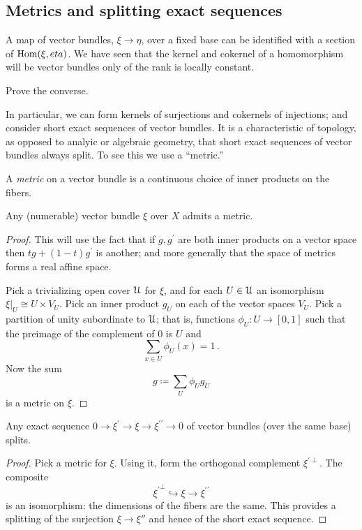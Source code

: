 \subsection{Metrics and splitting exact sequences}
A map of vector bundles, $\xi\to\eta$, over a fixed base can be identified
with a section of $\operatorname{Hom}(\xi,eta)$.  
We have seen that the kernel and cokernel of a homomorphism will be vector
bundles only of the rank is locally constant. 
\begin{exercise} Prove the converse. 
\end{exercise} 
In particular, we can form kernels of surjections and cokernels of injections;
and consider short exact sequences of vector bundles. It is a characteristic
of topology, as opposed to analyic or algebraic geometry, that short exact
sequences of vector bundles always split. To see this we use a ``metric.''
\begin{definition}
A \emph{metric} on a vector bundle is a continuous choice of inner products on
the fibers.
\end{definition}
\begin{lemma}
    Any (numerable) vector bundle $\xi$ over $X$ admits a metric.
\end{lemma}
\begin{proof}
This will use the fact that if $g,g^\prime$ are both inner
products on a vector space then $tg+(1-t)g^\prime$ is another; 
and more generally that the space of metrics forms a real affine space.

    Pick a trivializing open cover $\mathcal U$ for $\xi$, and for each $U\in\mathcal U$
an isomorphism $\xi|_U\cong U\times V_U$. Pick an inner product $g_U$
on each of the vector spaces $V_U$. Pick a partition of unity subordinate 
to $\mathcal U$; that is, functions $\phi_U:U\to [0,1]$ such that the
    preimage of the complement of $0$ is $U$ and
    $$
\sum_{x\in U} \phi_U(x) = 1\,.
$$
Now the sum
    $$
g \coloneqq \sum_{U}\phi_U g_U
$$
is a metric on $\xi$.
\end{proof}
\begin{corollary}\label{split}
    Any exact sequence $0\to\xi^\prime\to\xi\to\xi^{\prime\prime}\to 0$ 
of vector bundles (over the same base) splits.
\end{corollary}
\begin{proof}
    Pick a metric for $\xi$. Using it, form the orthogonal complement 
$\xi^{'\perp}$. The composite
    $$
{\xi^\prime}^\perp\hookrightarrow\xi\to\xi^{\prime\prime}
$$
is an isomorphism: the dimensions of the fibers are the same. 
This provides a splitting of the surjection $\xi\to\xi''$ and hence 
of the short exact sequence.
\end{proof}

